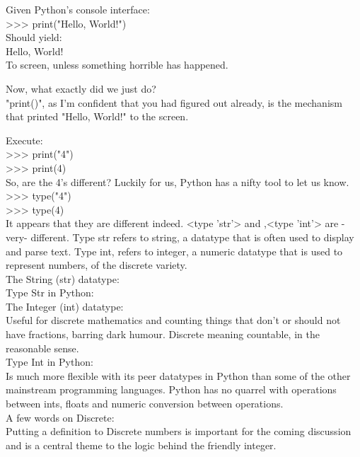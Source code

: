 \documentclass[oneside,12pt]{memoir} %
\begin{document}
Given Python's console interface:\\

{>}{>}{>} print("Hello, World!")\\

Should yield:\\
Hello, World!\\
To screen, unless something horrible has happened. 


Now, what exactly did we just do? \\
"print()", as I'm confident that you had figured out already, is the mechanism that printed "Hello, World!" to the screen. 


Execute:\\
{>}{>}{>} print("4")\\
{>}{>}{>} print(4)\\

So, are the 4's different? Luckily for us, Python has a nifty tool to let us know. \\
{>}{>}{>} type("4")\\
{>}{>}{>} type(4)\\


It appears that they are different indeed. <type 'str'> and ,<type 'int'> are -very- different. Type str refers to string, a datatype that is often used to display and parse text. Type int, refers to integer, a numeric datatype that is used to represent numbers, of the discrete variety. \\

The String (str) datatype:\\

Type Str in Python:\\


The Integer (int) datatype:\\

Useful for discrete mathematics and counting things that don't or should not have fractions, barring dark humour. Discrete meaning countable, in the reasonable sense. \\

Type Int in Python:\\
Is much more flexible with its peer datatypes in Python than some of the other mainstream programming languages. Python has no quarrel with operations between ints, floats and numeric conversion between operations. \\

A few words on Discrete:\\
Putting a definition to Discrete numbers is important for the coming discussion and is a central theme to the logic behind the friendly integer. \\
\end{document}
